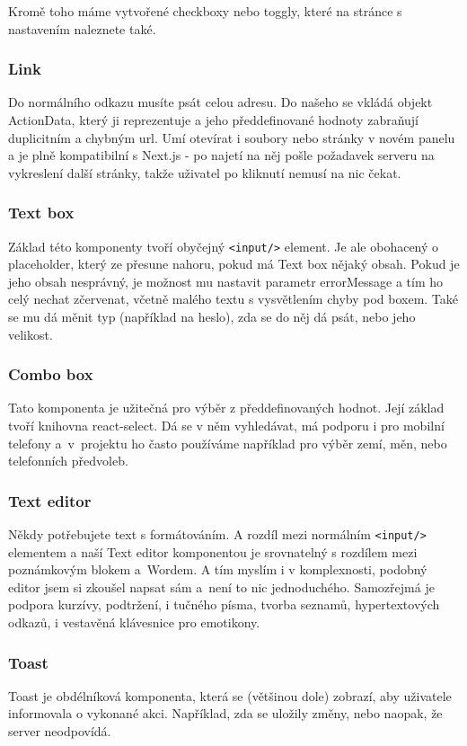 Kromě toho máme vytvořené checkboxy nebo toggly, které na stránce s nastavením naleznete také.

\subsubsection{Link}
Do normálního odkazu musíte psát celou adresu. Do našeho se vkládá objekt ActionData, který ji reprezentuje a jeho předdefinované hodnoty zabraňují duplicitním a chybným url. Umí otevírat i soubory nebo stránky v novém panelu a je plně kompatibilní s Next.js - po najetí na něj pošle požadavek serveru na vykreslení další stránky, takže uživatel po kliknutí nemusí na nic čekat.

\subsubsection{Text box}
Základ této komponenty tvoří obyčejný \texttt{<input/>} element. Je ale obohacený o placeholder, který ze přesune nahoru, pokud má Text box nějaký obsah. Pokud je jeho obsah nesprávný, je možnost mu nastavit parametr errorMessage a tím ho celý nechat zčervenat, včetně malého textu s vysvětlením chyby pod boxem. Také se mu dá měnit typ (například na heslo), zda se do něj dá psát, nebo jeho velikost.

\subsubsection{Combo box}
Tato komponenta je užitečná pro výběr z předdefinovaných hodnot. Její základ tvoří knihovna react-select. Dá se v něm vyhledávat, má podporu i pro mobilní telefony a~v~projektu ho často používáme například pro výběr zemí, měn, nebo telefonních předvoleb.

\subsubsection{Text editor}
Někdy potřebujete text s formátováním. A rozdíl mezi normálním \texttt{<input/>} elementem a naší Text editor komponentou je srovnatelný s rozdílem mezi poznámkovým blokem a~Wordem. A tím myslím i v komplexnosti, podobný editor jsem si zkoušel napsat sám a~není to nic jednoduchého. Samozřejmá je podpora kurzívy, podtržení, i tučného písma, tvorba seznamů, hypertextových odkazů, i vestavěná klávesnice pro emotikony.

\subsubsection{Toast}
Toast je obdélníková komponenta, která se (většinou dole) zobrazí, aby uživatele informovala o vykonané akci. Například, zda se uložily změny, nebo naopak, že server neodpovídá.

